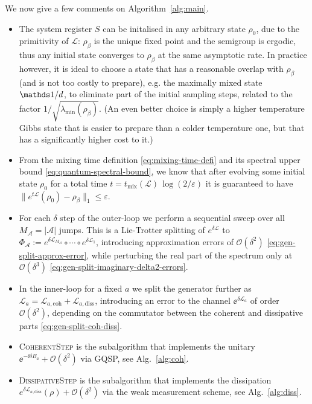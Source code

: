 We now give a few comments on Algorithm~\eqref{alg:main}. 
\begin{itemize}
    \item The system register $S$ can be initalised in any arbitrary state $\rho_0$, due to the primitivity of $\mathcal{L}$: $\rho_\beta$ is the unique fixed point and the semigroup is ergodic, thus any initial state converges to $\rho_\beta$ at the same asymptotic rate. In practice however, it is ideal to choose a state that has a reasonable overlap with $\rho_\beta$ (and is not too costly to prepare), e.g. the maximally mixed state $\idm / d$, to eliminate part of the initial sampling steps, related to the factor $1/\sqrt{\lambda_{\min}(\rho_\beta)}$. (An even better choice is simply a higher temperature Gibbs state that is easier to prepare than a colder temperature one, but that has a significantly higher cost to it.)
    \item From the mixing time definition \eqref{eq:mixing-time-defi} and its spectral upper bound \eqref{eq:quantum-spectral-bound}, we know that after evolving some initial state $\rho_0$ for a total time $t = t_{\mathrm{mix}}(\mathcal{L})\,\log(2/\varepsilon)$ it is guaranteed to have $\|e^{t\mathcal{L}}(\rho_0) - \rho_\beta\|_1 \leq \varepsilon$. 
    \item For each $\delta$ step of the outer-loop we perform a sequential sweep over all $M_\mathcal{A} = |\mathcal{A}|$ jumps. This is a Lie-Trotter splitting of $e^{\delta\mathcal{L}}$ to $\Phi_\mathcal{A} := e^{\delta\mathcal{L}_{M_\mathcal{A}}} \circ \cdots \circ e^{\delta\mathcal{L}_1}$, introducing approximation errors of $\mathcal{O}(\delta^2)$ \eqref{eq:gen-split-approx-error}, while perturbing the real part of the spectrum only at $\mathcal{O}(\delta^3)$ \eqref{eq:gen-split-imaginary-delta2-errors}.
    \item In the inner-loop for a fixed $a$ we split the generator further as $\mathcal{L}_a = \mathcal{L}_{a,\mathrm{coh}} + \mathcal{L}_{a,\mathrm{diss}}$, introducing an error to the channel $\ee^{\delta \mathcal{L}_a}$ of order $\mathcal{O}(\delta^2)$, depending on the commutator between the coherent and dissipative parts \eqref{eq:gen-split-coh-diss}.
    \item \textsc{CoherentStep} is the subalgorithm that implements the unitary $\ee^{-\ii \delta B_a} + \mathcal{O}(\delta^2)$ via GQSP, see Alg.~\eqref{alg:coh}.
    \item \textsc{DissipativeStep} is the subalgorithm that implements the dissipation $e^{\delta\mathcal{L}_{a,\mathrm{diss}}}(\rho) + \mathcal{O}(\delta^2)$ via the weak measurement scheme, see Alg.~\eqref{alg:diss}.
\end{itemize}
\medskip 

